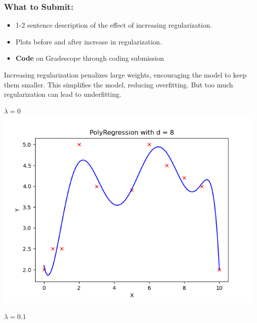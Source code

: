 \documentclass{article}
\begin{document}
\begin{aprob}
    \subsubsection*{What to Submit:}
    \begin{itemize}
        \item 1-2 sentence description of the effect of increasing regularization.
        \item Plots before and after increase in regularization.
        \item \textbf{Code} on Gradescope through coding submission
    \end{itemize}
    \begin{tcolorbox}[colback=lightgray!10!white, colframe=black, title=A3]
        Increasing regularization penalizes large weights, encouraging the model to keep them
        smaller. This simplifies the model, reducing overfitting. But too much regularization
        can lead to underfitting. \\
        \vspace{0.5em}
        \begin{center}
        \begin{minipage}{0.45\textwidth}
            \centering
            \textbf{$\lambda = 0$} \\[0.3em]
            \includegraphics[width=\textwidth]{PolyRegression0Regularization.png}
        \end{minipage}
        \hfill
        \begin{minipage}{0.45\textwidth}
            \centering
            \textbf{$\lambda = 0.1$} \\[0.3em]

\end{minipage}
\end{center}
\end{tcolorbox}
\end{aprob}
\end{document}
